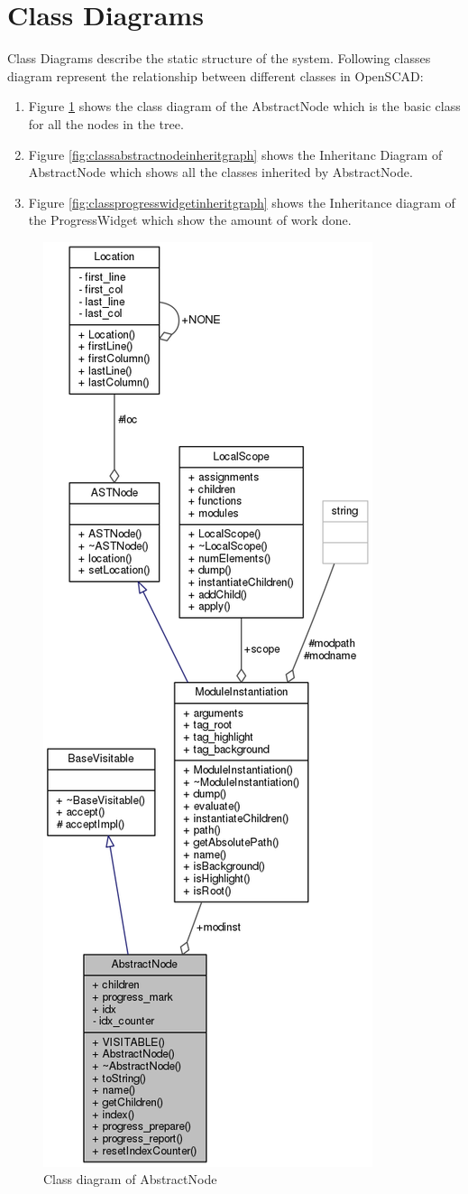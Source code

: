 \section{Class Diagrams}
Class Diagrams describe the static structure of the system. Following classes diagram represent the relationship between different classes in OpenSCAD:
\begin{enumerate}
	\item Figure \ref{fig:classabstractnodecollgraph} shows the class diagram of the AbstractNode which is the basic class for all the nodes in the tree.
	\item Figure \ref{fig:classabstractnodeinheritgraph} shows the Inheritanc Diagram of AbstractNode which shows all the classes inherited by AbstractNode.
	\item Figure \ref{fig:classprogresswidgetinheritgraph}  shows the Inheritance diagram of the ProgressWidget which show the amount of work done.
\end{enumerate}

\begin{figure}[H]
\centering
\includegraphics[width=0.5\linewidth]{images/classAbstractNode__coll__graph}
\caption{Class diagram of AbstractNode}
\label{fig:classabstractnodecollgraph}
\end{figure}

